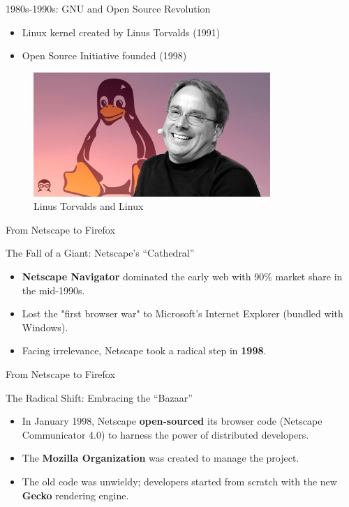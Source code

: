 \documentclass{beamer}
\begin{document}
\begin{frame}[t]{1980s-1990s: GNU and Open Source Revolution}
    \begin{itemize}
        \item Linux kernel created by Linus Torvalds (1991)
        \item Open Source Initiative founded (1998)
    \end{itemize}
    \begin{figure}
        \includegraphics[width=0.8\textwidth]{images/Linus-Torvalds-Linux.png}
        \caption{Linus Torvalds and Linux}
    \end{figure}
\end{frame}

\begin{frame}[t]{From Netscape to Firefox}

\begin{block}{The Fall of a Giant: Netscape's ``Cathedral''}
\begin{itemize}
    \item \textbf{Netscape Navigator} dominated the early web with 90\% market share in the mid-1990s.
    \item Lost the "first browser war" to Microsoft's Internet Explorer (bundled with Windows).
    \item Facing irrelevance, Netscape took a radical step in \textbf{1998}.
\end{itemize}
\end{block}
\end{frame}

\begin{frame}[t]{From Netscape to Firefox}
\begin{block}{The Radical Shift: Embracing the ``Bazaar''}
\begin{itemize}
    \item In January 1998, Netscape \textbf{open-sourced} its browser code (Netscape Communicator 4.0) to harness the power of distributed developers.
    \item The \textbf{Mozilla Organization} was created to manage the project.
    \item The old code was unwieldy; developers started from scratch with the new \textbf{Gecko} rendering engine.
\end{itemize}
\end{block}

\end{frame}
\end{document}
